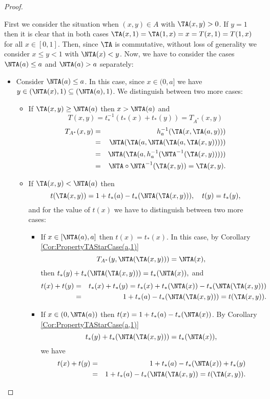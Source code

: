 \begin{proof}
\begin{description}
		First we consider the situation when $(x,y) \in A$ with $\TA(x,y)>0$. If $y=1$ then it is clear that in both cases $\TA(x,1)=\TA(1,x)=x=T(x,1)=T(1,x)$ for all $x \in [0,1]$. Then, since $\TA$ is commutative, without loss of generality we consider $x \leq y<1$ with $\NTA(x)<y$. Now, we have to consider the cases $ \NTA(a) \leq a$ and $\NTA(a)>a$ separately:
		\begin{itemize}
			\item Consider $\NTA(a) \leq a$. In this case,  since $x \in (0,a]$ we have $y \in (\NTA(x),1) \subseteq (\NTA(a),1)$. We distinguish between two more cases:
			\begin{itemize}
				\item If $\TA(x,y) \geq \NTA(a)$ then $x > \NTA(a)$ and
				$$T(x,y)=t_*^{-1}(t_*(x)+t_*(y))= T_{A^*}(x,y)$$
				\begin{eqnarray*}
					T_{A^*}(x,y)&=&h_a^{-1}(\TA(x,\TA(a,y)))\\
					&=& \NTA(\TA(a,\NTA(\TA(a,\TA(x,y))))) \\
					&=& \NTA(\TA(a,h_a^{-1}(\NTA^{-1}(\TA(x,y)))))\\
					&=&\NTA \circ \NTA^{-1}(\TA(x,y))=\TA(x,y).
				\end{eqnarray*}
				\item If $\TA(x,y) < \NTA(a)$ then
				$$t(\TA(x,y))=1+t_*(a)-t_*(\NTA(\TA(x,y))), \quad t(y)=t_*(y),$$
				and for the value of $t(x)$ we have to distinguish between two more cases:
				\begin{itemize}
					\item If $x \in [\NTA(a),a]$ then $t(x)=t_*(x)$. In this case, by Corollary \ref{Cor:PropertyTAStarCase(a,1)}
					$$T_{A^*}(y,\NTA(\TA(x,y)))=\NTA(x),$$
					then $t_*(y)+t_*(\NTA(\TA(x,y))) = t_*(\NTA(x)),$ and
					\begin{eqnarray*}
						t(x)+t(y) &=& t_*(x)+t_*(y) = t_*(x)+t_*(\NTA(x))-t_*(\NTA(\TA(x,y))) \\
						&=& 1+t_*(a) -t_*(\NTA(\TA(x,y))) = t(\TA(x,y)).
					\end{eqnarray*}
					\item If $x \in (0,\NTA(a))$ then  $t(x)=1+t_*(a)-t_*(\NTA(x))$. By Corollary \ref{Cor:PropertyTAStarCase(a,1)}
					$$t_*(y)+t_*(\NTA(\TA(x,y)))=t_*(\NTA(x)),$$
					we have
					\begin{eqnarray*}
					t(x)+t(y) & = & 1+t_*(a)-t_*(\NTA(x))+t_*(y)\\
					& = & 1+t_*(a)-t_*(\NTA(\TA(x,y))
					 =  t(\TA(x,y)).
					\end{eqnarray*}			

\end{itemize}
\end{itemize}
\end{itemize}
\end{description}
\end{proof}

